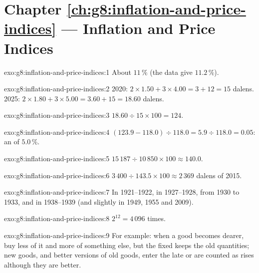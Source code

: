 \section*{Chapter \ref{ch:g8:inflation-and-price-indices} --- Inflation and Price Indices}

\begin{solution}{exo:g8:inflation-and-price-indices:1}
About $11\,\%$ (the data give $11.2\,\%$).
\end{solution}

\begin{solution}{exo:g8:inflation-and-price-indices:2}
2020: $2 \times 1.50 + 3 \times 4.00 = 3 + 12 = 15$ dalens. 2025: $2 \times 1.80 + 3 \times 5.00 =
3.60 + 15 = 18.60$ dalens.
\end{solution}

\begin{solution}{exo:g8:inflation-and-price-indices:3}
$18.60 \div 15 \times 100 = 124$.
\end{solution}

\begin{solution}{exo:g8:inflation-and-price-indices:4}
$(123.9 - 118.0) \div 118.0 = 5.9 \div 118.0 = 0.05$: an  of $5.0\,\%$.
\end{solution}

\begin{solution}{exo:g8:inflation-and-price-indices:5}
$15\,187 \div 10\,850 \times 100 \approx 140.0$.
\end{solution}

\begin{solution}{exo:g8:inflation-and-price-indices:6}
$3\,400 \div 143.5 \times 100 \approx 2\,369$ dalens of 2015.
\end{solution}

\begin{solution}{exo:g8:inflation-and-price-indices:7}
In 1921--1922, in 1927--1928, from 1930 to 1933, and in 1938--1939 (and slightly in 1949, 1955 and
2009).
\end{solution}

\begin{solution}{exo:g8:inflation-and-price-indices:8}
$2^{12} = 4\,096$ times.
\end{solution}

\begin{solution}{exo:g8:inflation-and-price-indices:9}
For example: when a good becomes dearer,  buy less of it and more of something else, but
the fixed  keeps the old quantities; new goods, and better versions of old goods, enter the
 late or are counted as  rises although they are better.
\end{solution}

